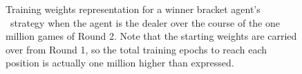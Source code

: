 \begin{figure}
\caption{
	Training weights representation for a winner bracket agent's \handmaxavg\
	strategy when the agent is the dealer
	over the course of the one million games of Round 2.
	Note that the starting weights are carried over from Round 1,
	so the total training epochs to reach each position is actually
	one million higher than expressed.
}
\label{fig:r2-flip-winner}
\end{figure}
